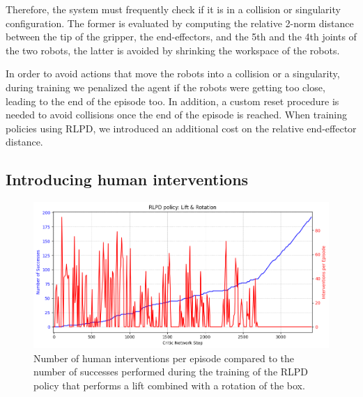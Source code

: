 \documentclass[letterpaper, 10 pt, conference]{ieeeconf}  %
\begin{document}
Therefore, the system must frequently check if it is in a collision or singularity configuration. The former is evaluated by computing the relative 2-norm distance between the tip of the gripper, the end-effectors, and the 5th and the 4th joints of the two robots, the latter is avoided by shrinking the workspace of the robots. 

In order to avoid actions that move the robots into a collision or a singularity, during training we penalized the agent if the robots were getting too close, leading to the end of the episode too. In addition, a custom reset procedure is needed to avoid collisions once the end of the episode is reached.
When training policies using RLPD, we introduced an additional cost on the relative end-effector distance. 


\subsection{Introducing human interventions}\label{hil}

\begin{figure}[t]
    \centering
    \includegraphics[width=1\linewidth]{images/hil.png}
    \caption{Number of human interventions per episode compared to the number of successes performed during the training of the RLPD policy that performs a lift combined with a rotation of the box.}
    \label{hil-plot}
\end{figure}
\end{document}
